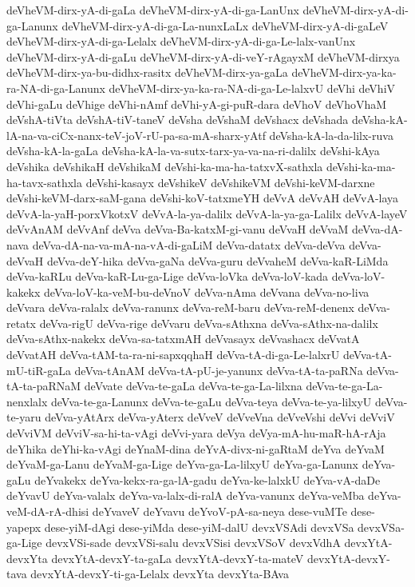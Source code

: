 {deVheVM-dirx-yA-di-gaLa
deVheVM-dirx-yA-di-ga-LanUnx
deVheVM-dirx-yA-di-ga-Lanunx
deVheVM-dirx-yA-di-ga-La-nunxLaLx
deVheVM-dirx-yA-di-gaLeV
deVheVM-dirx-yA-di-ga-Lelalx
deVheVM-dirx-yA-di-ga-Le-lalx-vanUnx
deVheVM-dirx-yA-di-gaLu
deVheVM-dirx-yA-di-veY-rAgayxM
deVheVM-dirxya
deVheVM-dirx-ya-bu-didhx-rasitx
deVheVM-dirx-ya-gaLa
deVheVM-dirx-ya-ka-ra-NA-di-ga-Lanunx
deVheVM-dirx-ya-ka-ra-NA-di-ga-Le-lalxvU
deVhi
deVhiV
deVhi-gaLu
deVhige
deVhi-nAmf
deVhi-yA-gi-puR-dara
deVhoV
deVhoVhaM
deVshA-tiVta
deVshA-tiV-taneV
deVsha
deVshaM
deVshacx
deVshada
deVsha-kA-lA-na-va-ciCx-nanx-teV-joV-rU-pa-sa-mA-sharx-yAtf
deVsha-kA-la-da-lilx-ruva
deVsha-kA-la-gaLa
deVsha-kA-la-va-sutx-tarx-ya-va-na-ri-dalilx
deVshi-kAya
deVshika
deVshikaH
deVshikaM
deVshi-ka-ma-ha-tatxvX-sathxla
deVshi-ka-ma-ha-tavx-sathxla
deVshi-kasayx
deVshikeV
deVshikeVM
deVshi-keVM-darxne
deVshi-keVM-darx-saM-gana
deVshi-koV-tatxmeYH
deVvA
deVvAH
deVvA-laya
deVvA-la-yaH-porxVkotxV
deVvA-la-ya-dalilx
deVvA-la-ya-ga-Lalilx
deVvA-layeV
deVvAnAM
deVvAnf
deVva
deVva-Ba-katxM-gi-vanu
deVvaH
deVvaM
deVva-dA-nava
deVva-dA-na-va-mA-na-vA-di-gaLiM
deVva-datatx
deVva-deVva
deVva-deVvaH
deVva-deY-hika
deVva-gaNa
deVva-guru
deVvaheM
deVva-kaR-LiMda
deVva-kaRLu
deVva-kaR-Lu-ga-Lige
deVva-loVka
deVva-loV-kada
deVva-loV-kakekx
deVva-loV-ka-veM-bu-deVnoV
deVva-nAma
deVvana
deVva-no-liva
deVvara
deVva-ralalx
deVva-ranunx
deVva-reM-baru
deVva-reM-denenx
deVva-retatx
deVva-rigU
deVva-rige
deVvaru
deVva-sAthxna
deVva-sAthx-na-dalilx
deVva-sAthx-nakekx
deVva-sa-tatxmAH
deVvasayx
deVvashacx
deVvatA
deVvatAH
deVva-tAM-ta-ra-ni-sapxqqhaH
deVva-tA-di-ga-Le-lalxrU
deVva-tA-mU-tiR-gaLa
deVva-tAnAM
deVva-tA-pU-je-yanunx
deVva-tA-ta-paRNa
deVva-tA-ta-paRNaM
deVvate
deVva-te-gaLa
deVva-te-ga-La-lilxna
deVva-te-ga-La-nenxlalx
deVva-te-ga-Lanunx
deVva-te-gaLu
deVva-teya
deVva-te-ya-lilxyU
deVva-te-yaru
deVva-yAtArx
deVva-yAterx
deVveV
deVveVna
deVveVshi
deVvi
deVviV
deVviVM
deVviV-sa-hi-ta-vAgi
deVvi-yara
deVya
deVya-mA-hu-maR-hA-rAja
deYhika
deYhi-ka-vAgi
deYnaM-dina
deYvA-divx-ni-gaRtaM
deYva
deYvaM
deYvaM-ga-Lanu
deYvaM-ga-Lige
deYva-ga-La-lilxyU
deYva-ga-Lanunx
deYva-gaLu
deYvakekx
deYva-kekx-ra-ga-lA-gadu
deYva-ke-lalxkU
deYva-vA-daDe
deYvavU
deYva-valalx
deYva-va-lalx-di-ralA
deYva-vanunx
deYva-veMba
deYva-veM-dA-rA-dhisi
deYvaveV
deYvavu
deYvoV-pA-sa-neya
dese-vuMTe
dese-yapepx
dese-yiM-dAgi
dese-yiMda
dese-yiM-dalU
devxVSAdi
devxVSa
devxVSa-ga-Lige
devxVSi-sade
devxVSi-salu
devxVSisi
devxVSoV
devxVdhA
devxYtA-devxYta
devxYtA-devxY-ta-gaLa
devxYtA-devxY-ta-mateV
devxYtA-devxY-tava
devxYtA-devxY-ti-ga-Lelalx
devxYta
devxYta-BAva
}

